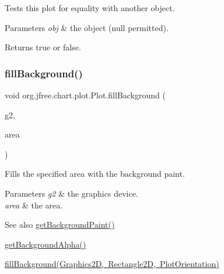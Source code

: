 Tests this plot for equality with another object.


\begin{DoxyParams}{Parameters}
{\em obj} & the object ({\ttfamily null} permitted).\\
\hline
\end{DoxyParams}
\begin{DoxyReturn}{Returns}
{\ttfamily true} or {\ttfamily false}. 
\end{DoxyReturn}
\mbox{\label{classorg_1_1jfree_1_1chart_1_1plot_1_1_plot_a9a67683b45601d61fdaa719357e79d87}} 
\subsubsection{\texorpdfstring{fill\+Background()}{fillBackground()}\hspace{0.1cm}{\footnotesize\ttfamily [1/2]}}
{\footnotesize\ttfamily void org.\+jfree.\+chart.\+plot.\+Plot.\+fill\+Background (\begin{DoxyParamCaption}\item[{Graphics2D}]{g2,  }\item[{Rectangle2D}]{area }\end{DoxyParamCaption})\hspace{0.3cm}{\ttfamily [protected]}}

Fills the specified area with the background paint.


\begin{DoxyParams}{Parameters}
{\em g2} & the graphics device. \\
\hline
{\em area} & the area.\\
\hline
\end{DoxyParams}
\begin{DoxySeeAlso}{See also}
\mbox{\hyperlink{classorg_1_1jfree_1_1chart_1_1plot_1_1_plot_aea2235170b06d5107e49522a96d7d19f}{get\+Background\+Paint()}} 

\mbox{\hyperlink{classorg_1_1jfree_1_1chart_1_1plot_1_1_plot_ad9d25c2b8b15314bf48b6bbb8be98bc0}{get\+Background\+Alpha()}} 

\mbox{\hyperlink{classorg_1_1jfree_1_1chart_1_1plot_1_1_plot_a5dc280b2c523fcdad0a4634f41f2cf33}{fill\+Background(\+Graphics2\+D, Rectangle2\+D, Plot\+Orientation)}} 
\end{DoxySeeAlso}
\mbox{\label{classorg_1_1jfree_1_1chart_1_1plot_1_1_plot_a5dc280b2c523fcdad0a4634f41f2cf33}} 
